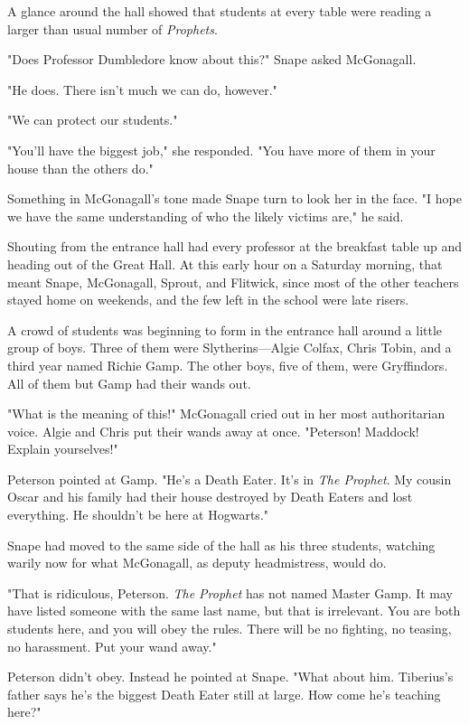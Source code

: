 A glance around the hall showed that students at every table were reading a larger than usual number of \emph{Prophets}.

"Does Professor Dumbledore know about this?" Snape asked McGonagall.

"He does. There isn't much we can do, however."

"We can protect our students."

"You'll have the biggest job," she responded. "You have more of them in your house than the others do."

Something in McGonagall's tone made Snape turn to look her in the face. "I hope we have the same understanding of who the likely victims are," he said.

Shouting from the entrance hall had every professor at the breakfast table up and heading out of the Great Hall. At this early hour on a Saturday morning, that meant Snape, McGonagall, Sprout, and Flitwick, since most of the other teachers stayed home on weekends, and the few left in the school were late risers.

A crowd of students was beginning to form in the entrance hall around a little group of boys. Three of them were Slytherins—Algie Colfax, Chris Tobin, and a third year named Richie Gamp. The other boys, five of them, were Gryffindors. All of them but Gamp had their wands out.

"What is the meaning of this!" McGonagall cried out in her most authoritarian voice. Algie and Chris put their wands away at once. "Peterson! Maddock! Explain yourselves!"

Peterson pointed at Gamp. "He's a Death Eater. It's in \emph{The Prophet}. My cousin Oscar and his family had their house destroyed by Death Eaters and lost everything. He shouldn't be here at Hogwarts."

Snape had moved to the same side of the hall as his three students, watching warily now for what McGonagall, as deputy headmistress, would do.

"That is ridiculous, Peterson. \emph{The Prophet} has not named Master Gamp. It may have listed someone with the same last name, but that is irrelevant. You are both students here, and you will obey the rules. There will be no fighting, no teasing, no harassment. Put your wand away."

Peterson didn't obey. Instead he pointed at Snape. "What about him. Tiberius's father says he's the biggest Death Eater still at large. How come he's teaching here?"

